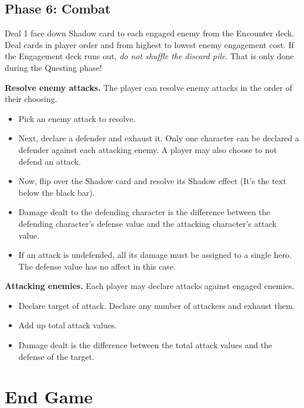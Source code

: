 \documentclass[12pt]{article}
\newenvironment{itemizeCustom}
{\begin{itemize}
  \setlength{\itemsep}{1pt}
  \setlength{\parskip}{0pt}
  \setlength{\parsep}{0pt}}
{\end{itemize}}
\begin{document}
\begin{multicols*}{2}
\subsection*{Phase 6: Combat}
Deal 1 face down Shadow card to each engaged enemy from the Encounter deck. Deal cards in player order and from highest to lowest enemy engagement cost. If the Engagement deck runs out, \emph{do not shuffle the discard pile}. That is only done during the Questing phase!

\noindent
\textbf{Resolve enemy attacks.} The player can resolve enemy attacks in the order of their choosing. 
\begin{itemizeCustom}
	\item Pick an enemy attack to resolve.
	\item Next, declare a defender and exhaust it. Only one character can be declared a defender against each attacking enemy. A player may also choose to not defend an attack. 
	\item Now, flip over the Shadow card and resolve its Shadow effect (It's the text below the black bar). 
	\item Damage dealt to the defending character is the difference between the defending character's defense value and the attacking character's attack value.
	\item If an attack is undefended, all its damage must be assigned to a single hero. The defense value has no affect in this case.
\end{itemizeCustom}

\noindent
\textbf{Attacking enemies.} Each player may declare attacks against engaged enemies. 
\begin{itemizeCustom}
	\item Declare target of attack. Declare any number of attackers and exhaust them.
	\item Add up total attack values.
	\item Damage dealt is the difference between the total attack values and the defense of the target.
\end{itemizeCustom}

\section*{End Game}

\end{multicols*}
\end{document}
